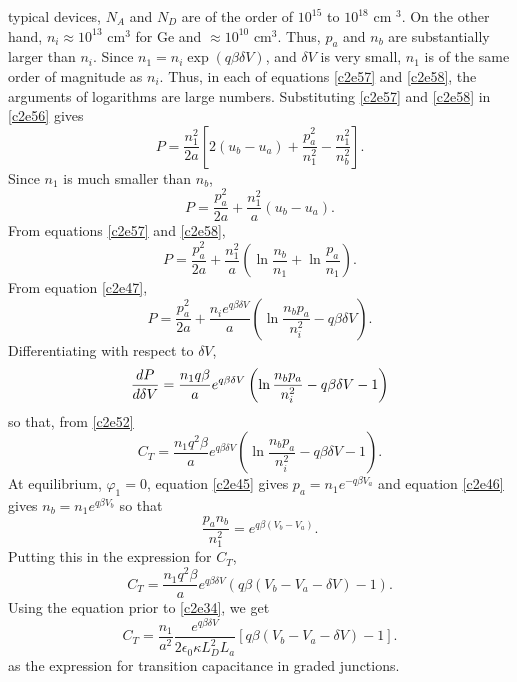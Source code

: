 \begin{enumerate}
typical devices, $N_A$ and $N_D$ are of the order of $10^{15}$ to $10^{18}$ cm
$^3$. On the other hand, $n_i \approx 10^{13}$ cm$^3$ for Ge and 
$\approx 10^{10}$ cm$^3$. Thus, $p_a$ and $n_b$ are substantially larger than
$n_i$. Since $n_1 = n_i \exp(q\beta\delta V)$, and $\delta V$ is very small,
$n_1$ is of the same order of magnitude as $n_i$. Thus, in each of equations
\eqref{c2e57} and \eqref{c2e58}, the arguments of logarithms are large numbers.
Substituting \eqref{c2e57} and \eqref{c2e58} in \eqref{c2e56} gives
\[
P = \frac{n_1^2}{2a}\left[2(u_b-u_a) + \frac{p_a^2}{n_1^2} -
\frac{n_1^2}{n_b^2}\right].
\]
Since $n_1$ is much smaller than $n_b$,
\begin{equation}\label{c2e59}
P = \frac{p_a^2}{2a} + \frac{n_1^2}{a}(u_b - u_a).
\end{equation}
From equations \eqref{c2e57} and \eqref{c2e58},
\begin{equation}\label{c2e60}
P = \frac{p_a^2}{2a} + \frac{n_1^2}{a}\left(\ln\frac{n_b}{n_1} + \ln\frac{p_a}
{n_1}\right).
\end{equation}
From equation \eqref{c2e47},
\begin{equation}\label{c2e61}
P = \frac{p_a^2}{2a} + \frac{n_ie^{q\beta\delta V}}{a}\left(\ln\frac{n_bp_a}
{n_i^2} - q\beta\delta V\right).
\end{equation}
Differentiating with respect to $\delta V$,
\[
\frac{d{P}}{d{\delta V}} = \frac{n_1q\beta}{a}e^{q\beta\delta V}\left(\ln\frac{n_bp_a}
{n_i^2} - q\beta\delta V - 1\right)
\]
so that, from \eqref{c2e52}
\[
C_T = \frac{n_1q^2\beta}{a}e^{q\beta\delta V}\left(\ln\frac{n_bp_a}{n_i^2} - 
q\beta\delta V - 1\right).
\]
At equilibrium, $\varphi_1 = 0$, equation \eqref{c2e45} gives $p_a=n_1
e^{-q\beta V_a}$ and equation \eqref{c2e46} gives $n_b = n_1e^{q\beta V_b}$
so that
\[
\frac{p_an_b}{n_1^2} = e^{q\beta(V_b - V_a)}.
\]
Putting this in the expression for $C_T$,
\[
C_T = \frac{n_1q^2\beta}{a}e^{q\beta\delta V}\left(q\beta(V_b - V_a - \delta V)
- 1\right).
\]
Using the equation prior to \eqref{c2e34}, we get
\begin{equation}\label{c2e62}
C_T = \frac{n_1}{a^2}\frac{e^{q\beta\delta V}}{2\epsilon_0\kappa L_D^2L_a}
[q\beta(V_b - V_a - \delta V) - 1].
\end{equation}
as the expression for transition capacitance in graded junctions.


\end{enumerate}
